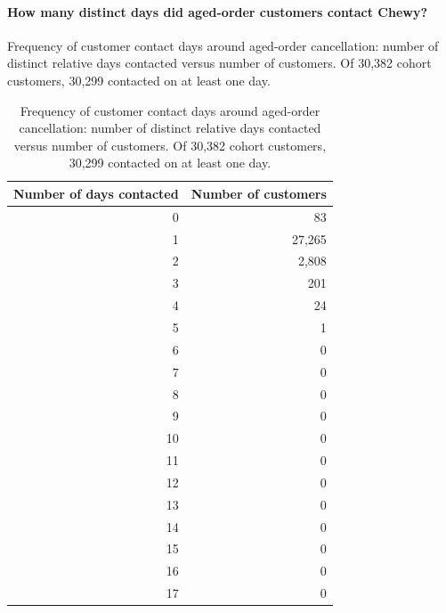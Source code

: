 \paragraph{How many distinct days did aged-order customers contact Chewy?}
Frequency of customer contact days around aged-order cancellation: number of distinct relative days contacted versus number of customers. Of 30,382 cohort customers, 30,299 contacted on at least one day.

\begin{table}[!htbp]
\centering
\caption{Frequency of customer contact days around aged-order cancellation: number of distinct relative days contacted versus number of customers. Of 30,382 cohort customers, 30,299 contacted on at least one day.}
\label{tab:aged-customer-contact-day-frequency}
\begin{tabular}{@{}rr@{}}
\toprule
Number of days contacted & Number of customers \\
\midrule

0 & 83 \\

1 & 27,265 \\

2 & 2,808 \\

3 & 201 \\

4 & 24 \\

5 & 1 \\

6 & 0 \\

7 & 0 \\

8 & 0 \\

9 & 0 \\

10 & 0 \\

11 & 0 \\

12 & 0 \\

13 & 0 \\

14 & 0 \\

15 & 0 \\

16 & 0 \\

17 & 0 \\
\bottomrule
\end{tabular}


\end{table}
